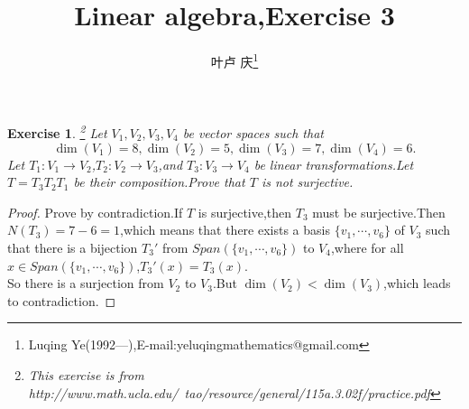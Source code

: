 \documentclass[a4paper]{article}
\newtheorem*{exe}{Exercise}
\newenvironment{exercise}
{\bigskip\begin{mdframed}\begin{exe}}
    {\end{exe}\end{mdframed}\bigskip}
\begin{document}
\title{\huge{\bf{Linear algebra,Exercise 3}}} \author{\small{叶卢
    庆\footnote{Luqing
      Ye(1992---),E-mail:yeluqingmathematics@gmail.com}}}
\maketitle
\begin{exercise}\footnote{This exercise is from
    http://www.math.ucla.edu/~tao/resource/general/115a.3.02f/practice.pdf}
  Let $V_1,V_2,V_3,V_4$ be vector spaces such that
$$
\dim (V_1)=8,\dim (V_2)=5,\dim (V_3)=7,\dim (V_4)=6.
$$
Let $T_1:V_1\to V_2$,$T_2:V_2\to V_3$,and $T_3:V_3\to V_4$ be linear
transformations.Let $T=T_3T_2T_1$ be their composition.Prove that $T$
is not surjective.
\end{exercise}
\begin{proof}
  Prove by contradiction.If $T$ is surjective,then $T_3$ must be
  surjective.Then $N(T_3)=7-6=1$,which means that there exists a basis
  $\{v_1,\cdots,v_6\}$ of $V_3$ such that there is a bijection $T_3'$
  from $Span (\{v_1,\cdots,v_6\})$ to $V_4$,where for all $x\in
  Span(\{v_1,\cdots,v_6\})$,$T_3'(x)=T_3(x)$.\\

So there is a surjection from $V_2$ to $V_3$.But $\dim (V_2)<\dim
(V_3)$,which leads to contradiction.
\end{proof}
\end{document}

